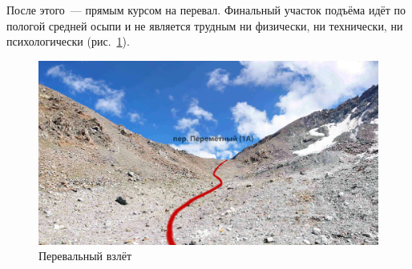 После этого~--- прямым курсом на перевал. Финальный участок подъёма идёт по пологой средней осыпи и не является трудным ни физически, ни технически, ни психологически (рис.~\ref{fig:DSC_0341}).
\begin{figure}[h!]
	\centering
	\includegraphics[width=0.7\linewidth]{../pics/DSC_0341.jpg}
	\caption{Перевальный взлёт}
	\label{fig:DSC_0341}
\end{figure} 

